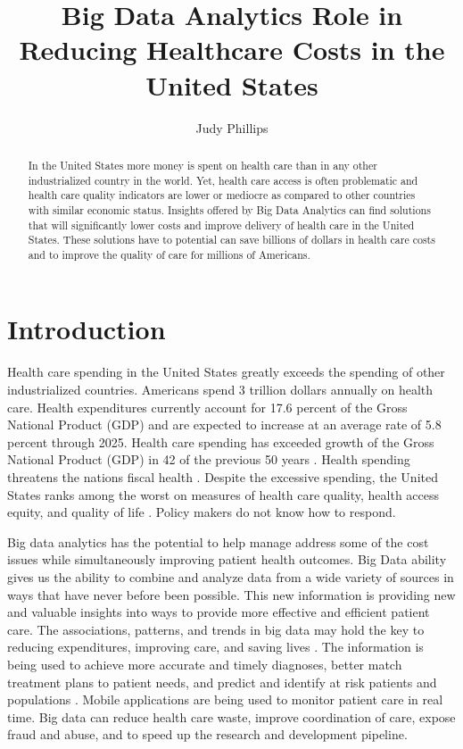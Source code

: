 \documentclass[sigconf]{acmart}
\begin{document}
\title{Big Data Analytics Role in Reducing Healthcare Costs in the United States}


\author{Judy Phillips}


\begin{abstract}
In the United States more money is spent on health care than in any other industrialized country in the world. Yet, health care access is often problematic and health care quality indicators are lower or mediocre as compared to other countries with similar economic status. Insights offered by Big Data Analytics can find solutions that will significantly lower costs and improve delivery of health care in the United States.  These solutions have to potential can save billions of dollars in health care costs and to improve the quality of care for millions of Americans. 
\end{abstract}
\maketitle

\section{Introduction}
Health care spending in the United States greatly exceeds the spending of other industrialized countries.  Americans spend 3 trillion dollars annually on health care. Health expenditures currently account for 17.6 percent of the Gross National Product (GDP) and are expected to increase at an average rate of 5.8 percent through 2025. Health care spending has exceeded growth of the Gross National Product (GDP) in 42 of the previous 50 years \cite{www-google-transparent}.  Health spending threatens the nations fiscal health \cite{springer}.  Despite the excessive spending, the United States ranks among the worst on measures of health care quality, health access equity, and quality of life \cite{www-google-McDonald}.  Policy makers do not know how to respond.

Big data analytics has the potential to help manage address some of the cost issues while simultaneously improving patient health outcomes.  Big Data ability gives us the ability to combine and analyze data from a wide variety of sources in ways that have never before been possible. This new information is providing new and valuable insights into ways to provide more effective and efficient patient care. The associations, patterns, and trends in big data may hold the key to reducing expenditures, improving care, and saving lives \cite{springer}.  The information is being used to achieve more accurate and timely diagnoses, better match treatment plans to patient needs, and predict and identify at risk patients and populations \cite{www-google-McDonald}.  Mobile applications are being used to monitor patient care in real time.   Big data can reduce health care waste, improve coordination of care, expose fraud and abuse, and to speed up the research and development pipeline.
\end{document}
